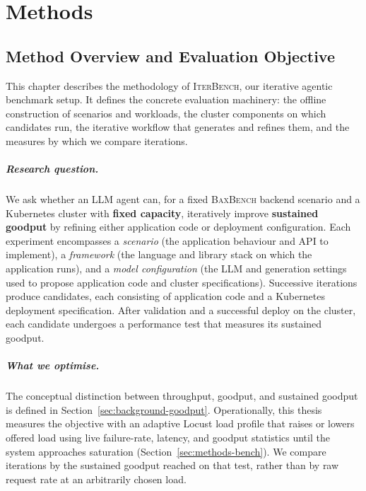 
\chapter{Methods}
\label{ch:methods}


\section{Method Overview and Evaluation Objective}
\label{sec:methods-overview}

This chapter describes the methodology of \textsc{IterBench}, our iterative
agentic benchmark setup. It defines the concrete evaluation machinery: the offline construction
of scenarios and workloads, the cluster components on which candidates run,
the iterative workflow that generates and refines them, and the measures by
which we compare iterations.

\paragraph{Research question.}
We ask whether an LLM agent can, for a fixed \textsc{BaxBench} backend scenario
and a Kubernetes cluster with \textbf{fixed capacity}, iteratively improve
\textbf{sustained goodput} by refining either application code or deployment
configuration. Each experiment encompasses a \emph{scenario} (the application
behaviour and API to implement), a \emph{framework} (the language and
library stack on which the application runs), and a \emph{model
configuration} (the LLM and generation settings used to propose application
code and cluster specifications). Successive iterations produce candidates,
each consisting of
application code and a Kubernetes deployment specification. After validation
and a successful deploy on the cluster, each candidate undergoes a performance
test that measures its sustained goodput.

\paragraph{What we optimise.}
The conceptual distinction between throughput, goodput, and sustained goodput
is defined in Section~\ref{sec:background-goodput}. Operationally, this thesis
measures the objective with an adaptive Locust load profile that raises or
lowers offered load using live failure-rate, latency, and goodput statistics
until the system approaches saturation (Section~\ref{sec:methods-bench}). We
compare iterations by the sustained goodput reached on that test, rather than
by raw request rate at an arbitrarily chosen load.

